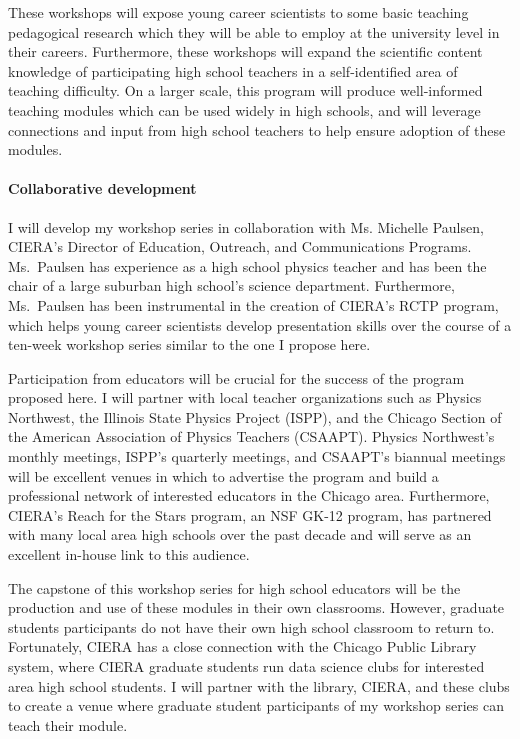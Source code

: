 \documentclass[11pt, preprint]{aastex}
\begin{document}
These workshops will expose young career scientists to some basic teaching pedagogical research which they will be able to employ at the university level in their careers.
Furthermore, these workshops will expand the scientific content knowledge of participating high school teachers in a self-identified area of teaching difficulty.
On a larger scale, this program will produce well-informed teaching modules which can be used widely in high schools, and will leverage connections and input from high school teachers to help ensure adoption of these modules.

\vspace{-0.5cm}
\paragraph{Collaborative development}
\label{sct:development}
I will develop my workshop series in collaboration with Ms. Michelle Paulsen, CIERA's Director of Education, Outreach, and Communications Programs.
Ms.~Paulsen has experience as a high school physics teacher and has been the chair of a large suburban high school's science department.
Furthermore, Ms.~Paulsen has been instrumental in the creation of CIERA's RCTP program, which helps young career scientists develop presentation skills over the course of a ten-week workshop series similar to the one I propose here.

Participation from educators will be crucial for the success of the program proposed here.
I will partner with local teacher organizations such as Physics Northwest, the Illinois State Physics Project (ISPP), and the Chicago Section of the American Association of Physics Teachers (CSAAPT).
Physics Northwest's monthly meetings, ISPP's quarterly meetings, and CSAAPT's biannual meetings will be excellent venues in which to advertise the program and build a professional network of interested educators in the Chicago area.
Furthermore, CIERA's Reach for the Stars program, an NSF GK-12 program, has partnered with many local area high schools over the past decade and will serve as an excellent in-house link to this audience.

The capstone of this workshop series for high school educators will be the production and use of these modules in their own classrooms.
However, graduate students participants do not have their own high school classroom to return to.
Fortunately, CIERA has a close connection with the Chicago Public Library system, where CIERA graduate students run data science clubs for interested area high school students.
I will partner with the library, CIERA, and these clubs to create a venue where graduate student participants of my workshop series can teach their module.
\end{document}
